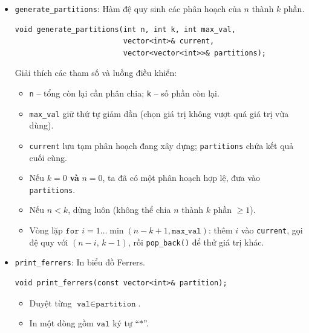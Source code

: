 \documentclass[a4paper,12pt]{article}
\begin{document}
\begin{itemize}

  \item \texttt{generate\_partitions}: Hàm đệ quy sinh các phân hoạch của \(n\) thành \(k\) phần.

    \begin{lstlisting}[style=cppstyle]
void generate_partitions(int n, int k, int max_val,
                         vector<int>& current,
                         vector<vector<int>>& partitions);
    \end{lstlisting}

    Giải thích các tham số và luồng điều khiển:
    \begin{itemize}
      \item \texttt{n} – tổng còn lại cần phân chia; \texttt{k} – số phần còn lại.  
      \item \texttt{max\_val} giữ thứ tự giảm dần (chọn giá trị không vượt quá giá trị vừa dùng).  
      \item \texttt{current} lưu tạm phân hoạch đang xây dựng; \texttt{partitions} chứa kết quả cuối cùng.  
      \item Nếu \(k=0\) \textbf{và} \(n=0\), ta đã có một phân hoạch hợp lệ, đưa vào \texttt{partitions}.  
      \item Nếu \(n<k\), dừng luôn (không thể chia \(n\) thành \(k\) phần \(\ge1\)).  
      \item Vòng lặp \(\texttt{for }i=1\dots\min(n-k+1,\texttt{max\_val})\):
        thêm \(i\) vào \texttt{current}, gọi đệ quy với \((n-i,\,k-1)\), rồi \texttt{pop\_back()} để thử giá trị khác.
    \end{itemize}

  \item \texttt{print\_ferrers}: In biểu đồ Ferrers.
    \begin{lstlisting}[style=cppstyle]
void print_ferrers(const vector<int>& partition);
    \end{lstlisting}
    \begin{itemize}
      \item Duyệt từng \(\texttt{val}\in\texttt{partition}\).  
      \item In một dòng gồm \(\texttt{val}\) ký tự “\(\ast\)”.
    \end{itemize}


\end{itemize}
\end{document}
